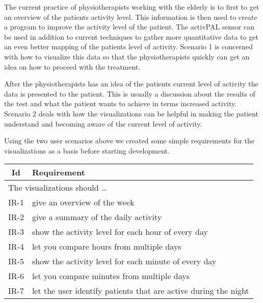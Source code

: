 The current practice of physiotherapists working with the elderly is to first to get an overview of the patients activity level. This information is then used to create a program to improve the activity level of the patient. The activPAL sensor can be used in addition to current techniques to gather more quantitative data to get an even better mapping of the patients level of activity. Scenario 1 is concerned with how to visualize this data so that the physiotherapists quickly can get an idea on how to proceed with the treatment.

After the physiotherapists has an idea of the patients current level of activity the data is presented to the patient. This is usually a discussion about the results of the test and what the patient wants to achieve in terms increased activity. Scenario 2 deals with how the visualizations can be helpful in making the patient understand and becoming aware of the current level of activity.

Using the two user scenarios above we created some simple requirements for the visualizations as a basis before starting development.

\begin{table}[h!]
  \begin{center}
  \begin{tabular}{|c|p{12cm}|}
    \hline
      \textbf{Id} & \textbf{Requirement} \\ \hline
    \multicolumn{2}{|l|}{The visualizations should \ldots} \\ \hline
      IR-1 & give an overview of the week \\ \hline
      IR-2 & give a summary of the daily activity \\ \hline
      IR-3 & show the activity level for each hour of every day \\ \hline
      IR-4 & let you compare hours from multiple days \\ \hline
      IR-5 & show the activity level for each minute of every day \\ \hline
      IR-6 & let you compare minutes from multiple days \\ \hline
      IR-7 & let the user identify patients that are active during the night \\ \hline
  \end{tabular}
  \end{center}
\end{table}
